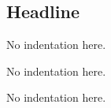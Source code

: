 \documentclass[10pt,parskip]{scrartcl}
\begin{document}
 \subsection*{Headline}

No indentation here.

No indentation here.

No indentation here.
\end{document}

